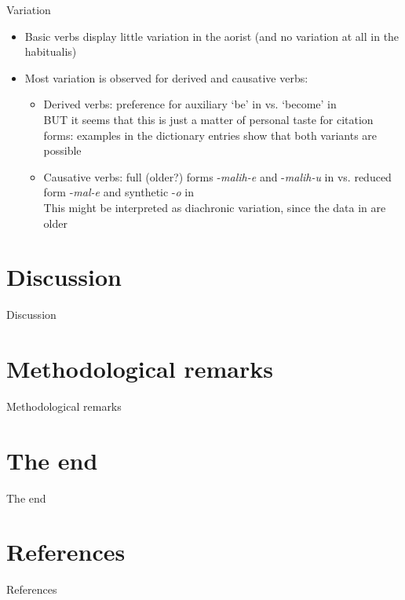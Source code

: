 \begin{frame}{Variation}
\begin{itemize}
    \item Basic verbs display little variation in the aorist (and no variation at all in the habitualis)
    \item Most variation is observed for derived and causative verbs:
    \begin{itemize}
        \item Derived verbs: preference for auxiliary `be' in \citet{saidovaabusov2012} vs. `become' in \citet{alekseev2019} \\ BUT it seems that this is just a matter of personal taste for citation forms: examples in the dictionary entries show that both variants are possible
        \item Causative verbs: full (older?) forms -\textit{malih-e} and -\textit{malih-u} in \citet{alekseev2019} vs. reduced form -\textit{mal-e} and synthetic -\textit{o} in \citet{saidovaabusov2012} \\ This might be interpreted as diachronic variation, since the data in \citet{alekseev2019} are older
    \end{itemize}
\end{itemize}
\end{frame}

\section{Discussion}
\begin{frame}{Discussion}
    
\end{frame}

\section{Methodological remarks}
\begin{frame}{Methodological remarks}
    
\end{frame}

\section{The end}
\begin{frame}{The end}
\begin{figure}[h]
\centering
{}
\end{figure}
\end{frame}

\section{References}
\begin{frame}[allowframebreaks]{References}
\printbibliography
\end{frame}


